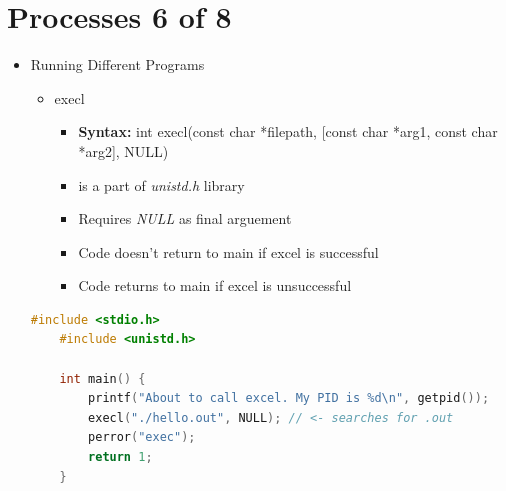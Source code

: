 \documentclass[12pt]{article}
\begin{document}
\bigskip

\section*{Processes 6 of 8}

\bigskip

\begin{itemize}
    \item Running Different Programs
    \begin{itemize}
        \item execl
        \begin{itemize}
            \item \textbf{Syntax:} int execl(const char *filepath, [const char *arg1, const char *arg2], NULL)
            \item is a part of \textit{unistd.h} library
            \item Requires \textit{NULL} as final arguement
            \item Code doesn't return to main if excel is successful
            \item Code returns to main if excel is unsuccessful
        \end{itemize}
    \end{itemize}

    \begin{lstlisting}[language=c,caption={process\_example\_4.c}]
    #include <stdio.h>
    #include <unistd.h>

    int main() {
        printf("About to call excel. My PID is %d\n", getpid());
        execl("./hello.out", NULL); // <- searches for .out
        perror("exec");
        return 1;
    }
    \end{lstlisting}

\end{itemize}
\end{document}
